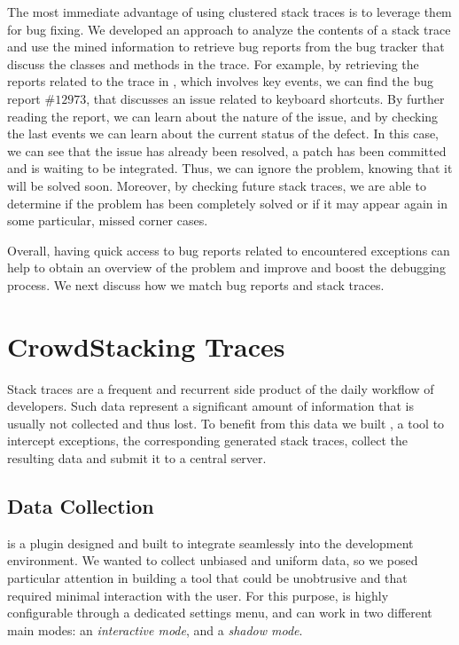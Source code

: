 The most immediate advantage of using clustered stack traces is to leverage them for bug fixing.
We developed an approach to analyze the contents of a stack trace and use the mined information to retrieve bug reports from the \pha bug tracker that discuss the classes and methods in the trace.
For example, by retrieving the reports related to the trace in , which involves key events, we can find the bug report $\#12973$, that discusses an issue related to keyboard shortcuts.
By further reading the report, we can learn about the nature of the issue, and by checking the last events we can learn about the current status of the defect.
In this case, we can see that the issue has already been resolved, a patch has been committed and is waiting to be integrated.
Thus, we can ignore the problem, knowing that it will be solved soon.
Moreover, by checking future stack traces, we are able to determine if the problem has been completely solved or if it may appear again in some particular, missed corner cases.

Overall, having quick access to bug reports related to encountered exceptions can help to obtain an overview of the problem and improve and boost the debugging process.
We next discuss how we match bug reports and stack traces.


\section{CrowdStacking Traces}\label{sec:stacktraces-dataset}

Stack traces are a frequent and recurrent side product of the daily workflow of developers.
Such data represent a significant amount of information that is usually not collected and thus lost.
To benefit from this data we built \slr, a tool to intercept exceptions, the corresponding generated stack traces, collect the resulting data and submit it to a central server.


\subsection{Data Collection}\label{sec:stacktraces-tool}

\slr is a plugin designed and built to integrate seamlessly into the \pha development environment.
We wanted to collect unbiased and uniform data, so we posed particular attention in building a tool that could be unobtrusive and that required minimal interaction with the user.
For this purpose, \slr is highly configurable through a dedicated settings menu, and can work in two different main modes: an \emph{interactive mode}, and a \emph{shadow mode}.

